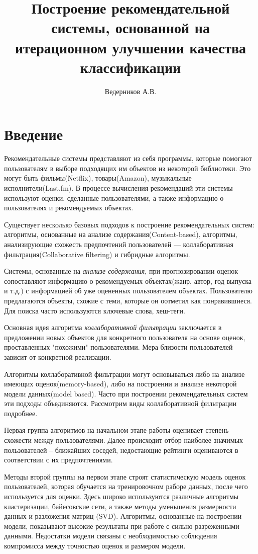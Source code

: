 \documentclass[12pt]{article} %
\title{Построение рекомендательной системы, основанной на итерационном улучшении качества классификации}
\author{Ведерников А.В.}
\begin{document}
\maketitle


\section{Введение}
\par Рекомендательные системы представляют из себя программы, которые помогают пользователям в выборе подходящих им объектов из некоторой библиотеки.  %
Это могут быть фильмы(Netflix), товары(Amazon), музыкальные исполнители(Last.fm). В процессе вычисления рекомендаций эти системы используют оценки, сделанные пользователями, а также информацию о пользователях и рекомендуемых объектах.


\par
Существует несколько базовых подходов к построение рекомендательных систем: алгоритмы, основанные на анализе содержания(Content-based), алгоритмы, анализирующие схожесть предпочтений пользователей --- коллаборативная фильтрация(Collaborative filtering) и гибридные алгоритмы. 
\par
Системы, основанные на \textit{анализе содержания}, при прогнозировании оценок сопоставляют информацию о рекомендуемых объектах(жанр, автор, год выпуска и т.д.) с информацией об уже оцененных пользователем объектах. Пользователю предлагаются объекты, схожие с теми, которые он оотметил как понравившиеся. Для поиска часто используются ключевые слова, хеш-теги. 
\par
Основная идея алгоритма \textit{коллаборативной фильтрации }заключается в предложении новых объектов для конкретного пользователя на основе оценок, проставленных "похожими" пользователями. Мера близости пользователей зависит от конкретной реализации.
\par
Алгоритмы коллаборативной фильтрации могут основываться либо на анализе имеющих оценок(memory-based), либо на построении и анализе некоторой модели данных(model based). Часто при построении рекомендательных систем эти подходы объединяются. Рассмотрим виды коллаборативной фильтрации подробнее.
\par
Первая группа алгоритмов на начальном этапе работы оценивает степень схожести между пользователями. Далее происходит отбор наиболее значимых пользователей -- ближайших соседей, недостающие рейтинги оцениваются в соответствии с их предпочтениями.
\par
Методы второй группы на первом этапе строят статистическую модель оценок пользователей, которая обучается на тренировочном раборе данных, после чего используется для оценки. Здесь широко используются различные алгоритмы кластеризации, байесовские сети, а также методы уменьшения размерности данных и разложения матриц (SVD). Алгоритмы, основанные на построении  модели, показывают высокие результаты при работе с сильно разреженными данными. Недостатки модели связаны с необходимостью соблюдения компромисса между точностью оценок и размером модели.
\end{document}

